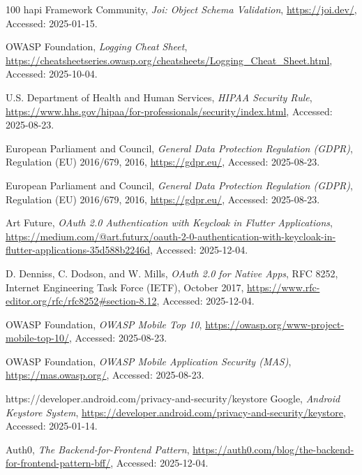 \begin{thebibliography}{100}
  hapi Framework Community,
  \textit{Joi: Object Schema Validation},
  \url{https://joi.dev/}, Accessed: 2025-01-15.

  OWASP Foundation,
  \textit{Logging Cheat Sheet},
  \url{https://cheatsheetseries.owasp.org/cheatsheets/Logging_Cheat_Sheet.html}, Accessed: 2025-10-04.

  U.S. Department of Health and Human Services,
  \textit{HIPAA Security Rule},
  \url{https://www.hhs.gov/hipaa/for-professionals/security/index.html}, Accessed: 2025-08-23.

  European Parliament and Council,
  \textit{General Data Protection Regulation (GDPR)},
  Regulation (EU) 2016/679, 2016,
  \url{https://gdpr.eu/}, Accessed: 2025-08-23.

  European Parliament and Council,
  \textit{General Data Protection Regulation (GDPR)},
  Regulation (EU) 2016/679, 2016,
  \url{https://gdpr.eu/}, Accessed: 2025-08-23.



  Art Future,
  \textit{OAuth 2.0 Authentication with Keycloak in Flutter Applications},
  \url{https://medium.com/@art.futurx/oauth-2-0-authentication-with-keycloak-in-flutter-applications-35d588b2246d}, Accessed: 2025-12-04.

  D. Denniss, C. Dodson, and W. Mills,
  \textit{OAuth 2.0 for Native Apps},
  RFC 8252, Internet Engineering Task Force (IETF), October 2017,
  \url{https://www.rfc-editor.org/rfc/rfc8252#section-8.12}, Accessed: 2025-12-04.

  OWASP Foundation,
  \textit{OWASP Mobile Top 10},
  \url{https://owasp.org/www-project-mobile-top-10/}, Accessed: 2025-08-23.

  OWASP Foundation,
  \textit{OWASP Mobile Application Security (MAS)},
  \url{https://mas.owasp.org/}, Accessed: 2025-08-23.

  https://developer.android.com/privacy-and-security/keystore
   Google, \textit{Android Keystore System},
  \url{https://developer.android.com/privacy-and-security/keystore}, Accessed:
  2025-01-14.

  Auth0,
  \textit{The Backend-for-Frontend Pattern},
  \url{https://auth0.com/blog/the-backend-for-frontend-pattern-bff/}, Accessed: 2025-12-04.


\end{thebibliography}
